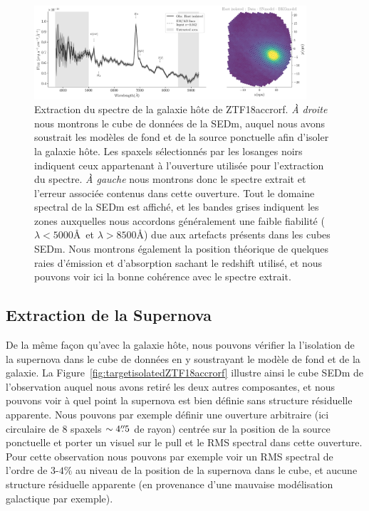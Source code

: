 \documentclass[../main/main.tex]{subfiles}
\begin{document}
\begin{figure}[ht]
  \centering
  \includegraphics[width=0.9\textwidth]{../figures/07_scene/output_host_ZTF18accrorf.pdf}
  \caption[Extraction du spectre de la galaxie hôte de
  ZTF18accrorf]{Extraction du spectre de la galaxie hôte de
    ZTF18accrorf. \emph{À droite} nous montrons le cube de données de la
  SEDm, auquel nous avons soustrait les modèles de fond et de la source
  ponctuelle afin d'isoler la galaxie hôte. Les spaxels sélectionnés par
les losanges noirs indiquent ceux appartenant à l'ouverture utilisée
pour l'extraction du spectre. \emph{À gauche} nous montrons donc le
spectre extrait et l'erreur associée contenus dans cette ouverture. Tout le domaine spectral
de la SEDm est affiché, et les bandes grises indiquent les zones
auxquelles nous accordons généralement une faible fiabilité ($\lambda<5000$\AA\ et
$\lambda>8500$\AA) due aux artefacts
présents dans les cubes SEDm. Nous montrons également la position
théorique de quelques raies d'émission et d'absorption sachant le
redshift utilisé, et nous pouvons voir ici la bonne cohérence avec le
spectre extrait.}
  \label{fig:hostspecZTF18accrorf}
\end{figure}

\subsection{Extraction de la Supernova}\label{ssec:snextraction}

De la même façon qu'avec la galaxie hôte, nous pouvons vérifier la
l'isolation de la supernova dans le cube de données en y soustrayant le
modèle de fond et de la galaxie. La
Figure~\ref{fig:targetisolatedZTF18accrorf} illustre ainsi le cube SEDm
de l'observation auquel nous avons retiré les deux autres composantes,
et nous pouvons voir à quel point la supernova est bien définie sans
structure résiduelle apparente. Nous pouvons par exemple définir une
ouverture arbitraire (ici circulaire de $8$ spaxels $\sim4\overset{\prime\prime}{.}5$ de
rayon) centrée sur la position de la source ponctuelle et porter un
visuel sur le pull et le RMS spectral dans cette ouverture. Pour cette
observation nous pouvons par exemple voir un RMS spectral de l'ordre de
$3$-$4\%$ au niveau de la position de la supernova dans le cube, et
aucune structure résiduelle apparente (en provenance d'une mauvaise
modélisation galactique par exemple).
\end{document}

